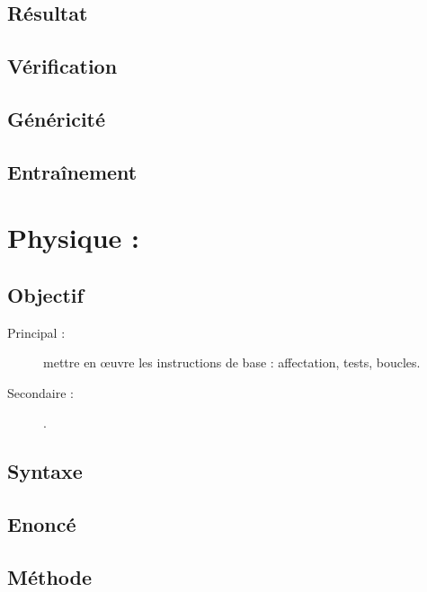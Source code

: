 \subsection{Résultat}\label{instructions:maths:resultat}

\subsection{Vérification}\label{instructions:maths:verification}

\subsection{Généricité}\label{instructions:maths:genericite}

\subsection{Entraînement}\label{instructions:maths:entrainement}

\section{Physique : }\label{instructions:physique}

\subsection{Objectif}\label{instructions:physique:objectif}
\begin{description}
\item[Principal : ] mettre en \oe uvre les instructions de base : affectation, tests, boucles.
\item[Secondaire :] .
\end{description}


\subsection{Syntaxe \python}\label{instructions:physique:python}

\subsection{Enoncé}\label{instructions:physique:enonce}

\subsection{Méthode}\label{instructions:physique:methode}


